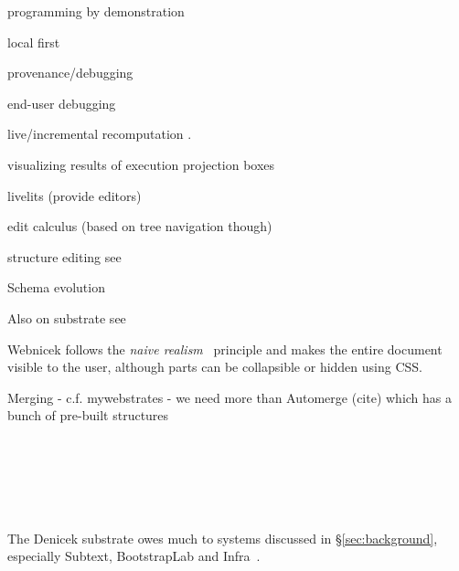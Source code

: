 \documentclass[sigconf,anonymous,screen]{acmart}
\begin{document}
programming by demonstration
\cite{leiva-2021-rapido,cypher-1993-pbd}
\cite{chen-2023-miwa}

local first
\cite{kleppmann-2019-local,klokmose-2024-mywebstrates}

provenance/debugging
\cite{ko-2004-whyline,ko-2009-whyline,krebs-2023-probelog}
\cite{ricciotti-2017-imperative,perera-2012-functional}
\cite{perera-2022-linked}

end-user debugging
\cite{kissinger-2006-debugging}

live/incremental recomputation
\cite{mcdirmid-2013-usable,horowitz-2023-engraft,petricek-2020-live}.

visualizing results of execution
projection boxes \cite{lerner-2020-boxes}

livelits (provide editors)
\cite{omar-2021-livelits}

edit calculus (based on tree navigation though)
\cite{omar-2017-hazelnut}

structure editing see \cite{beckman-2023-sandblocks}

Schema evolution

Also on substrate see



Webnicek follows the \emph{naive realism}~\cite{disessa-1986-boxer} principle and makes the entire
document visible to the user, although parts can be collapsible or hidden using CSS.


Merging - c.f. mywebstrates - we need more than Automerge (cite)
which has a bunch of pre-built structures

~

~

\cite{gobert-2023-lorgnette}

~

The Denicek substrate owes much to systems discussed in \S\ref{sec:background},
especially Subtext, BootstrapLab and Infra~\cite{edwards-2005-subtext,jakubovic-2022-ladder,hall-2017-infra}.


~

\end{document}
